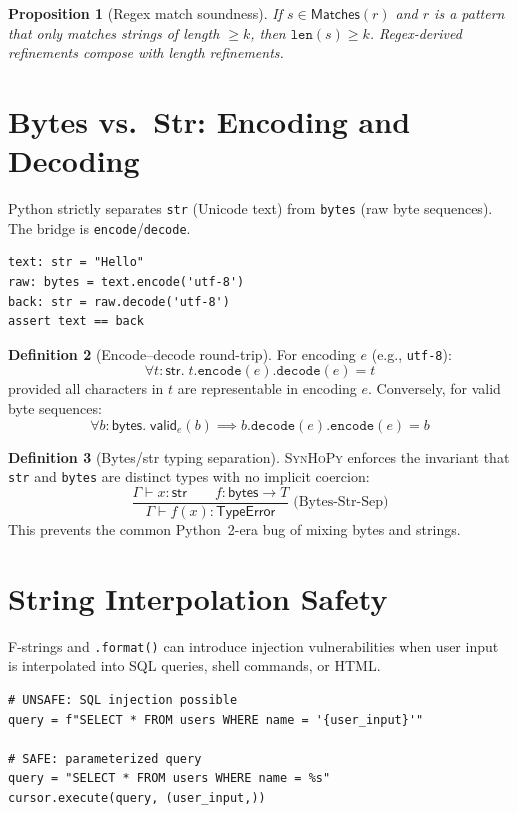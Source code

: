 \documentclass[11pt,a4paper]{report}
\theoremstyle{definition}
\newtheorem{definition}{Definition}[chapter]
\theoremstyle{plain}
\newtheorem{proposition}[definition]{Proposition}
\newcommand{\synhopy}{\textsc{SynHoPy}}
\begin{document}
\begin{proposition}[Regex match soundness]
If $s \in \mathsf{Matches}(r)$ and $r$ is a pattern that only matches strings
of length $\geq k$, then $\texttt{len}(s) \geq k$.  Regex-derived refinements
compose with length refinements.
\end{proposition}

\section{Bytes vs.\ Str: Encoding and Decoding}

Python strictly separates \texttt{str} (Unicode text) from \texttt{bytes}
(raw byte sequences).  The bridge is \texttt{encode}/\texttt{decode}.

\begin{lstlisting}[style=python]
text: str = "Hello"
raw: bytes = text.encode('utf-8')
back: str = raw.decode('utf-8')
assert text == back
\end{lstlisting}

\begin{definition}[Encode--decode round-trip]
For encoding $e$ (e.g., \texttt{utf-8}):
\[
  \forall t : \mathsf{str}.\;
  t.\texttt{encode}(e).\texttt{decode}(e) = t
\]
provided all characters in $t$ are representable in encoding $e$.
Conversely, for valid byte sequences:
\[
  \forall b : \mathsf{bytes}.\;
  \mathsf{valid}_e(b) \implies
  b.\texttt{decode}(e).\texttt{encode}(e) = b
\]
\end{definition}

\begin{definition}[Bytes/str typing separation]
\synhopy{} enforces the invariant that \texttt{str} and \texttt{bytes}
are distinct types with no implicit coercion:
\[
  \frac{
    \Gamma \vdash x : \mathsf{str} \qquad
    f : \mathsf{bytes} \to T
  }{
    \Gamma \vdash f(x) : \mathsf{TypeError}
  }
  \;\text{(Bytes-Str-Sep)}
\]
This prevents the common Python~2-era bug of mixing bytes and strings.
\end{definition}

\section{String Interpolation Safety}

F-strings and \texttt{.format()} can introduce injection vulnerabilities
when user input is interpolated into SQL queries, shell commands, or HTML.

\begin{lstlisting}[style=python]
# UNSAFE: SQL injection possible
query = f"SELECT * FROM users WHERE name = '{user_input}'"

# SAFE: parameterized query
query = "SELECT * FROM users WHERE name = %s"
cursor.execute(query, (user_input,))
\end{lstlisting}
\end{document}
